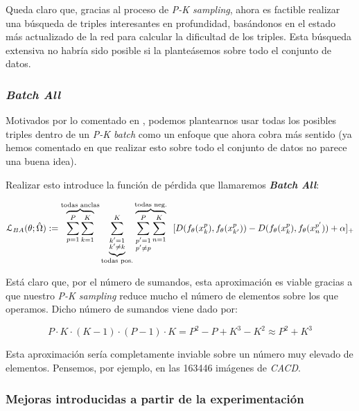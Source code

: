 Queda claro que, gracias al proceso de \textit{P-K sampling}, ahora es factible realizar una búsqueda de triples interesantes en profundidad, basándonos en el estado más actualizado de la red para calcular la dificultad de los triples. Esta búsqueda extensiva no habría sido posible si la planteásemos sobre todo el conjunto de datos.

\subsubsection{\textit{Batch All}} \label{isubsubs:batch_all}

Motivados por lo comentado en , podemos plantearnos usar todas los posibles triples dentro de un \textit{P-K batch} como un enfoque que ahora cobra más sentido (ya hemos comentado en  que realizar esto sobre todo el conjunto de datos no parece una buena idea).

Realizar esto introduce la función de pérdida que llamaremos \textbf{\textit{Batch All}}:

\begin{equation} \label{ieq:batch_all}
    \mathcal{L}_{BA}(\theta; \hat{\Omega}) :=
    \overbrace{\sum_{p = 1}^{P} \sum_{k = 1}^K}^\textrm{\text{todas anclas}}
    \underbrace{\sum_{\substack{k' = 1 \\ k' \neq k}}^{K}}_\textrm{\text{todas pos.}}
    \overbrace{\sum_{\substack{p' = 1 \\ p' \neq p}}^P \sum_{n = 1}^K}^\textrm{\text{todas neg.}} \ \ [
        D(f_{\theta}(x_k^p),f_{\theta}(x_{k'}^p)) - D(f_{\theta}(x_k^p),f_{\theta}(x_{n}^{p'})) + \alpha
    ]_+
\end{equation}

Está claro que, por el número de sumandos, esta aproximación es viable gracias a que nuestro \textit{P-K sampling} reduce mucho el número de elementos sobre los que operamos. Dicho número de sumandos viene dado por:

\begin{equation}
    P \cdot K \cdot (K - 1) \cdot (P - 1) \cdot K = P^2 - P + K^3 - K^2 \approx P^2 + K^3
\end{equation}

Esta aproximación sería completamente inviable sobre un número muy elevado de elementos. Pensemos, por ejemplo, en las 163446 imágenes de \textit{CACD}.

\subsubsection{Mejoras introducidas a partir de la experimentación}

